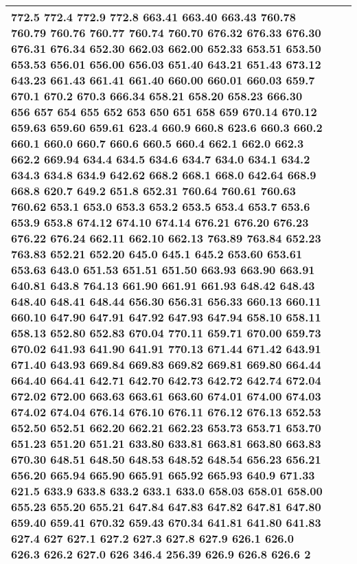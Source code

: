 \begin{longtable}{|L{.1in}|L{.6in}||L{5.65in}|}
772.5 772.4 772.9 772.8 663.41 663.40 663.43 760.78 760.79 760.76 760.77 760.74 760.70 676.32 676.33 676.30 676.31 676.34 652.30 662.03 662.00 652.33 653.51 653.50 653.53 656.01 656.00 656.03 651.40 643.21 651.43 673.12 643.23 661.43 661.41 661.40 660.00 660.01 660.03 659.7 670.1 670.2 670.3 666.34 658.21 658.20 658.23 666.30 656 657 654 655 652 653 650 651 658 659 670.14 670.12 659.63 659.60 659.61 623.4 660.9 660.8 623.6 660.3 660.2 660.1 660.0 660.7 660.6 660.5 660.4 662.1 662.0 662.3 662.2 669.94 634.4 634.5 634.6 634.7 634.0 634.1 634.2 634.3 634.8 634.9 642.62 668.2 668.1 668.0 642.64 668.9 668.8 620.7 649.2 651.8 652.31 760.64 760.61 760.63 760.62 653.1 653.0 653.3 653.2 653.5 653.4 653.7 653.6 653.9 653.8 674.12 674.10 674.14 676.21 676.20 676.23 676.22 676.24 662.11 662.10 662.13 763.89 763.84 652.23 763.83 652.21 652.20 645.0 645.1 645.2 653.60 653.61 653.63 643.0 651.53 651.51 651.50 663.93 663.90 663.91 640.81 643.8 764.13 661.90 661.91 661.93 648.42 648.43 648.40 648.41 648.44 656.30 656.31 656.33 660.13 660.11 660.10 647.90 647.91 647.92 647.93 647.94 658.10 658.11 658.13 652.80 652.83 670.04 770.11 659.71 670.00 659.73 670.02 641.93 641.90 641.91 770.13 671.44 671.42 643.91 671.40 643.93 669.84 669.83 669.82 669.81 669.80 664.44 664.40 664.41 642.71 642.70 642.73 642.72 642.74 672.04 672.02 672.00 663.63 663.61 663.60 674.01 674.00 674.03 674.02 674.04 676.14 676.10 676.11 676.12 676.13 652.53 652.50 652.51 662.20 662.21 662.23 653.73 653.71 653.70 651.23 651.20 651.21 633.80 633.81 663.81 663.80 663.83 670.30 648.51 648.50 648.53 648.52 648.54 656.23 656.21 656.20 665.94 665.90 665.91 665.92 665.93 640.9 671.33 621.5 633.9 633.8 633.2 633.1 633.0 658.03 658.01 658.00 655.23 655.20 655.21 647.84 647.83 647.82 647.81 647.80 659.40 659.41 670.32 659.43 670.34 641.81 641.80 641.83 627.4 627 627.1 627.2 627.3 627.8 627.9 626.1 626.0 626.3 626.2 627.0 626 346.4 256.39 626.9 626.8 626.6 2\\\hline

\end{longtable}
